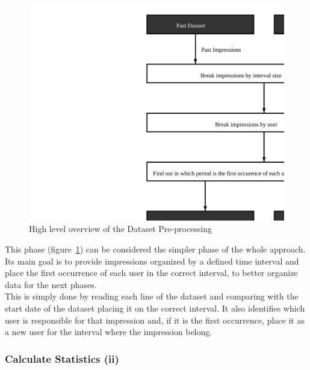 \begin{figure}[h] \begin{center} \leavevmode
\includegraphics[]{pre_processing_i} \caption{ High level overview
of the Dataset Pre-processing} \label{fig:pre_processing_i} \end{center} \end{figure}

This phase (figure~\ref{fig:pre_processing_i}) can be considered the simpler phase of the whole approach. Its main
goal is to provide impressions organized by a defined time interval and 
place the first occurrence of each user in the correct interval, to better
organize data for the next phases.
\\

This is simply done by reading each line of the dataset and comparing with the
start date of the dataset placing it on the correct interval. It also identifies
which user is responsible for that impression and, if it is the first occurrence,
place it as a new user for the interval where the impression belong.

\subsubsection{Calculate Statistics (ii)}\label{subsubsec:stats}

